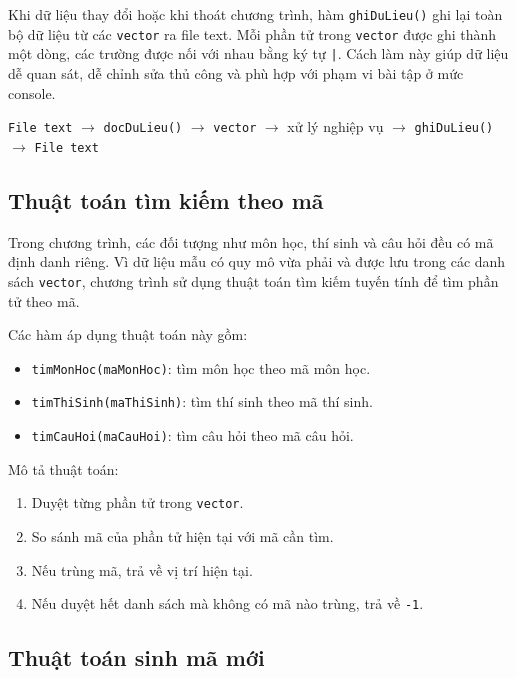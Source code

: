 \documentclass[12pt,a4paper]{report}
\begin{document}
Khi dữ liệu thay đổi hoặc khi thoát chương trình, hàm \texttt{ghiDuLieu()} ghi lại toàn bộ dữ liệu từ các \texttt{vector} ra file text. Mỗi phần tử trong \texttt{vector} được ghi thành một dòng, các trường được nối với nhau bằng ký tự \texttt{|}. Cách làm này giúp dữ liệu dễ quan sát, dễ chỉnh sửa thủ công và phù hợp với phạm vi bài tập ở mức console.

\begin{center}
\texttt{File text} $\rightarrow$ \texttt{docDuLieu()} $\rightarrow$ \texttt{vector} $\rightarrow$ xử lý nghiệp vụ $\rightarrow$ \texttt{ghiDuLieu()} $\rightarrow$ \texttt{File text}
\end{center}


\subsection{Thuật toán tìm kiếm theo mã}

Trong chương trình, các đối tượng như môn học, thí sinh và câu hỏi đều có mã định danh riêng. Vì dữ liệu mẫu có quy mô vừa phải và được lưu trong các danh sách \texttt{vector}, chương trình sử dụng thuật toán tìm kiếm tuyến tính để tìm phần tử theo mã.

Các hàm áp dụng thuật toán này gồm:

\begin{itemize}
    \item \texttt{timMonHoc(maMonHoc)}: tìm môn học theo mã môn học.
    \item \texttt{timThiSinh(maThiSinh)}: tìm thí sinh theo mã thí sinh.
    \item \texttt{timCauHoi(maCauHoi)}: tìm câu hỏi theo mã câu hỏi.
\end{itemize}

Mô tả thuật toán:

\begin{enumerate}
    \item Duyệt từng phần tử trong \texttt{vector}.
    \item So sánh mã của phần tử hiện tại với mã cần tìm.
    \item Nếu trùng mã, trả về vị trí hiện tại.
    \item Nếu duyệt hết danh sách mà không có mã nào trùng, trả về \texttt{-1}.
\end{enumerate}

\subsection{Thuật toán sinh mã mới}
\end{document}
